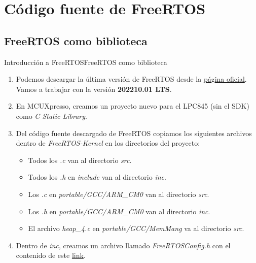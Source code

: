 \documentclass[aspectratio=169, xcolor=dvipsnames]{beamer}
\begin{document}
\section{Código fuente de FreeRTOS}
\subsection{FreeRTOS como biblioteca}
\begin{frame}{Introducción a FreeRTOS}{FreeRTOS como biblioteca}
\begin{enumerate}
    \item Podemos descargar la última versión de FreeRTOS desde la \href{https://www.freertos.org}{página oficial}. Vamos a trabajar con la versión \textbf{202210.01 LTS}.
    \item En MCUXpresso, creamos un proyecto nuevo para el LPC845 (sin el SDK) como \textit{C Static Library}.
    \item Del código fuente descargado de FreeRTOS copiamos los siguientes archivos dentro de \textit{FreeRTOS-Kernel} en los directorios del proyecto:
    \begin{itemize}
        \item Todos los \textit{.c} van al directorio \textit{src}.
        \item Todos los \textit{.h} en \textit{include} van al directorio \textit{inc}.
        \item Los \textit{.c} en \textit{portable/GCC/ARM\_CM0} van al directorio \textit{src}.
        \item Los \textit{.h} en \textit{portable/GCC/ARM\_CM0} van al directorio \textit{inc}.
        \item El archivo \textit{heap\_4.c} en \textit{portable/GCC/MemMang} va al directorio \textit{src}.
    \end{itemize}
    \item Dentro de \textit{inc}, creamos un archivo llamado \textit{FreeRTOSConfig.h} con el contenido de este \href{https://github.com/utn-fra-lse/lpc845/blob/main/ejemplos/freertos/inc/FreeRTOSConfig.h}{link}.
\end{enumerate}
\end{frame}
\end{document}
